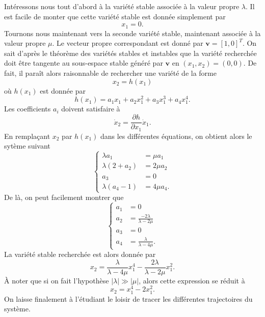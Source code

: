 \documentclass[12pt, answers]{exam}
\begin{document}
\begin{questions}
\begin{parts}
    \begin{solution}
      {\color{blue}
      Intéressons nous tout d'abord à la variété stable associée à la valeur propre $\lambda$. Il est facile de monter que cette variété stable est donnée simplement par
      $$
      x_1 = 0.
      $$
      Tournons nous maintenant vers la seconde variété stable, maintenant associée à la valeur propre $\mu$. Le vecteur propre correspondant est donné par $\bm{v} = \left[ 1 , 0 \right]^T$. On sait d'après le théorème des variétés stables et instables que la variété recherchée doit être tangente au sous-espace stable généré par $\bm{v}$ en $(x_1, x_2) = (0, 0)$. De fait, il paraît alors raisonnable de rechercher une variété de la forme
      $$
      x_2 = h(x_1)
      $$
      où $h(x_1)$ est donnée par
      $$
      h(x_1) = a_1 x_1 + a_2 x_1^2 + a_3 x_1^3 + a_4 x_1^4.
      $$
      Les coefficients $a_i$ doivent satisfaire à
      $$
      \dot{x}_2 = \displaystyle \frac{\partial h}{\partial x_1} \dot{x}_1.
      $$
      En rempla\c{c}ant $x_2$ par $h(x_1)$ dans les différentes équations, on obtient alors le sytème suivant
      $$
      \left\{
      \begin{aligned}
        \lambda a_1 & = \mu a_1 \\
        \lambda (2 + a_2) & = 2 \mu a_2 \\
        a_3 & = 0 \\
        \lambda (a_4 -1) & = 4\mu a_4.
      \end{aligned}
      \right.
      $$
      De là, on peut facilement montrer que
      $$
      \left\{
      \begin{aligned}
        a_1 & = 0 \\
        a_2 & = \displaystyle \frac{-2\lambda}{\lambda - 2\mu} \\
        a_3 & = 0 \\
        a_4 & = \displaystyle \frac{\lambda}{\lambda - 4\mu}.
      \end{aligned}
      \right.
      $$
      La variété stable recherchée est alors donnée par
      $$
      x_2 = \displaystyle \frac{\lambda}{\lambda - 4\mu} x_1^4 - \frac{2\lambda}{\lambda - 2\mu}x_1^2.
      $$
      \`A noter que si on fait l'hypothèse $\vert \lambda \vert \gg \vert \mu \vert$, alors cette expression se réduit à
      $$
      x_2 = x_1^4 - 2 x_1^2.
      $$
      On laisse finalement à l'étudiant le loisir de tracer les différentes trajectoires du système.
      }
    \end{solution}


\end{parts}
\end{questions}
\end{document}
